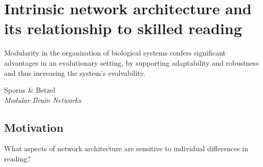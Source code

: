 \chapter{Intrinsic network architecture and its relationship to skilled reading}

\epigraph{Modularity in the organization of biological systems confers significant advantages in an evolutionary setting, by supporting adaptability and robustness and thus increasing the system's evolvability.}{Sporns \& Betzel\\\textit{Modular Brain Networks}}

\section{Motivation}


\item What aspects of network architecture are sensitive to individual differences in reading?
